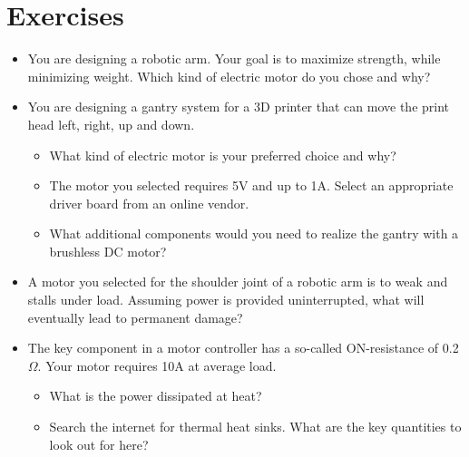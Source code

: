 \section{Exercises}
\begin{itemize}
\item You are designing a robotic arm. Your goal is to maximize strength, while minimizing weight. Which kind of electric motor do you chose and why?
\item You are designing a gantry system for a 3D printer that can move the print head left, right, up and down.
\begin{itemize}
\item What kind of electric motor is your preferred choice and why? 
\item The motor you selected requires 5V and up to 1A. Select an appropriate driver board from an online vendor.
\item What additional components would you need to realize the gantry with a brushless DC motor? 
\end{itemize}
\item A motor you selected for the shoulder joint of a robotic arm is to weak and stalls under load. Assuming power is provided uninterrupted, what will eventually lead to permanent damage? 
\item The key component in a motor controller has a so-called ON-resistance of 0.2$\Omega$. Your motor requires 10A at average load.
\begin{itemize}
\item What is the power dissipated at heat?
\item Search the internet for thermal heat sinks. What are the key quantities to look out for here?
\end{itemize}
\end{itemize}
